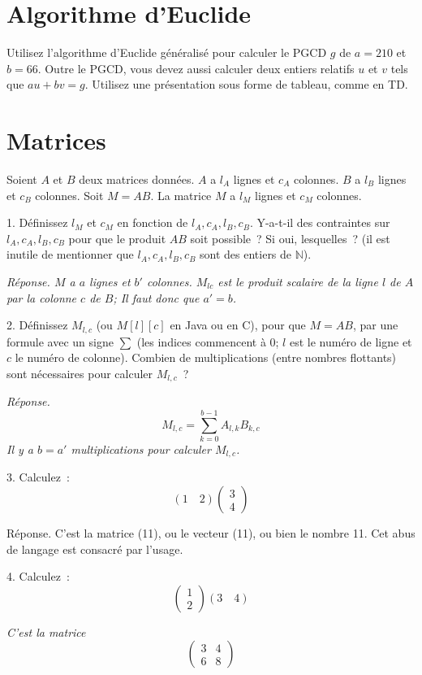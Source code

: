 \documentclass[11pt]{article}
\def\N{\mathbb N}
\begin{document}
{
\section{Algorithme d'Euclide}
Utilisez  l'algorithme d'Euclide généralisé
pour calculer le PGCD $g$ de $a=210$ et $b=66$. Outre le PGCD, vous devez
aussi calculer deux entiers relatifs $u$ et $v$ tels que $a u + b v=g$.
Utilisez une présentation sous forme de tableau, comme en TD.
}

{
\section{Matrices}
Soient $A$ et $B$ deux matrices données. $A$ a $l_A$ lignes et $c_A$ colonnes.
$B$ a $l_B$ lignes et $c_B$ colonnes. Soit $M= A B$. La matrice $M$ a $l_M$ lignes et $c_M$ colonnes. 

1. Définissez $l_M$ et $c_M$ en fonction de $l_A, c_A, l_B, c_B$. Y-a-t-il des
contraintes  sur $l_A, c_A, l_B, c_B$
pour que le produit $AB$ soit possible~? Si oui, lesquelles~? (il est inutile de mentionner que  $l_A, c_A, l_B, c_B$ sont des entiers de $\N$).  

\ifcorrige

\medskip
{\it 
Réponse. $M$ a $a$ lignes et $b'$ colonnes. $M_{lc}$ est le produit scalaire
de la ligne $l$ de $A$ par la colonne $c$ de $B$; Il faut donc que $a'=b$. 
}
\medskip


\else
\fi

2. Définissez $M_{l,c}$ (ou $M[l][c]$ en Java ou en C), pour que $M=AB$,
par une formule avec un signe $\sum$ (les indices commencent à 0; $l$ est le numéro de ligne et $c$ le numéro de colonne).
Combien de multiplications (entre nombres flottants) sont nécessaires pour calculer  $M_{l,c}$~?

\ifcorrige

\medskip
{\it 
Réponse. $$M_{l,c}= \sum_{k=0}^{b-1} A_{l,k} B_{k,c} $$
Il y a $b=a'$ multiplications pour calculer $M_{l,c}$.
}
\medskip


\else
\fi


{
3.  Calculez~:
$$\left( 1 \quad 2\right) \left(\begin{array}{c} 3\\
4
\end{array}\right) $$


{
\ifcorrige

\medskip
{\it

Réponse. C'est la matrice (11), ou le vecteur (11), ou bien le nombre 11. Cet abus de langage est consacré par l'usage. 
}
\medskip

\else
\fi
}

4. Calculez~:
$$\left(\begin{array}{c} 1 \\
2
\end{array}\right) \left( 3\quad 4\right) $$

\ifcorrige

\medskip

{\it C'est la matrice $$\left(\begin{array}{cc} 3 & 4 \\
6 & 8 \end{array}\right)$$
}
\medskip


\else
\fi
}
\bigskip
}
\end{document}
